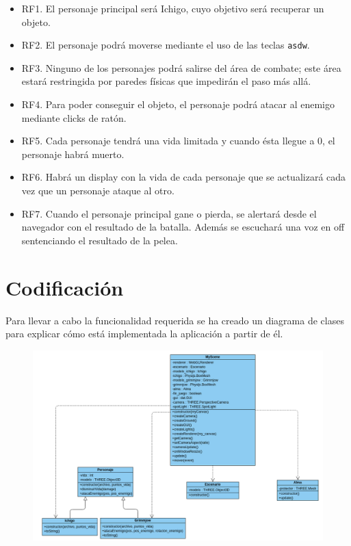 \documentclass[11pt,a4paper]{article}
\begin{document}
\begin{itemize}
	\item RF1. El personaje principal será Ichigo, cuyo objetivo será recuperar un objeto.
	\item RF2. El personaje podrá moverse mediante el uso de las teclas \color{morado}\texttt{asdw}\color{black}.
	\item RF3. Ninguno de los personajes podrá salirse del área de combate; este área estará restringida por paredes físicas que impedirán el paso más allá.
	\item RF4. Para poder conseguir el objeto, el personaje podrá atacar al enemigo mediante clicks de ratón.
	\item RF5. Cada personaje tendrá una vida limitada y cuando ésta llegue a 0, el personaje habrá muerto.
	\item RF6. Habrá un display con la vida de cada personaje que se actualizará cada vez que un personaje ataque al otro.
	\item RF7. Cuando el personaje principal gane o pierda, se alertará desde el navegador con el resultado de la batalla. Además se escuchará una voz en off sentenciando el resultado de la pelea.
\end{itemize}

\section{Codificación}

Para llevar a cabo la funcionalidad requerida se ha creado un diagrama de clases para explicar cómo está implementada la aplicación a partir de él.

\begin{figure}[H]
	\centering
	\includegraphics[scale=0.4]{img/diagrama.png}
\end{figure}
\end{document}
